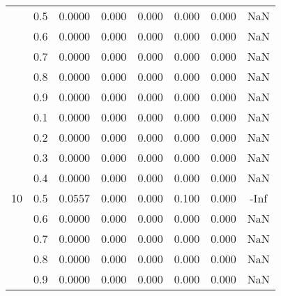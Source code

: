 \documentclass[11pt,a4paper]{report}
\begin{document}
\begin{longtable}{ | c | c || c | c | c | c | c | c | }
 & 0.5 & 0.0000 & 0.000 & 0.000 & 0.000 & 0.000 & NaN \\
 & 0.6 & 0.0000 & 0.000 & 0.000 & 0.000 & 0.000 & NaN \\
 & 0.7 & 0.0000 & 0.000 & 0.000 & 0.000 & 0.000 & NaN \\
 & 0.8 & 0.0000 & 0.000 & 0.000 & 0.000 & 0.000 & NaN \\
 & 0.9 & 0.0000 & 0.000 & 0.000 & 0.000 & 0.000 & NaN \\
 \hline
\multirow{9}{*}{10} & 0.1 & 0.0000 & 0.000 & 0.000 & 0.000 & 0.000 & NaN \\
 & 0.2 & 0.0000 & 0.000 & 0.000 & 0.000 & 0.000 & NaN \\
 & 0.3 & 0.0000 & 0.000 & 0.000 & 0.000 & 0.000 & NaN \\
 & 0.4 & 0.0000 & 0.000 & 0.000 & 0.000 & 0.000 & NaN \\
 & 0.5 & 0.0557 & 0.000 & 0.000 & 0.100 & 0.000 & -Inf \\
 & 0.6 & 0.0000 & 0.000 & 0.000 & 0.000 & 0.000 & NaN \\
 & 0.7 & 0.0000 & 0.000 & 0.000 & 0.000 & 0.000 & NaN \\
 & 0.8 & 0.0000 & 0.000 & 0.000 & 0.000 & 0.000 & NaN \\
 & 0.9 & 0.0000 & 0.000 & 0.000 & 0.000 & 0.000 & NaN \\
 \hline
\hline
\end{longtable}
\end{document}

